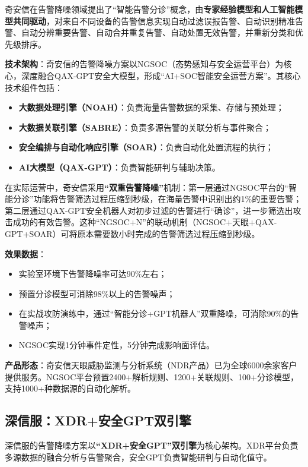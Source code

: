 \documentclass[11pt,a4paper]{article}
\begin{document}
奇安信在告警降噪领域提出了“智能告警分诊”概念，由\textbf{专家经验模型和人工智能模型共同驱动}，对来自不同设备的告警信息实现自动过滤误报告警、自动识别精准告警、自动分辨重要告警、自动合并重复告警、自动处置无效告警，并重新分类和优先级排序。

\textbf{技术架构}：奇安信的告警降噪方案以NGSOC（态势感知与安全运营平台）为核心，深度融合QAX-GPT安全大模型，形成“AI+SOC智能安全运营方案”。其核心技术组件包括：
\begin{itemize}
    \item \textbf{大数据处理引擎（NOAH）}：负责海量告警数据的采集、存储与预处理；
    \item \textbf{大数据关联引擎（SABRE）}：负责多源告警的关联分析与事件聚合；
    \item \textbf{安全编排与自动化响应引擎（SOAR）}：负责自动化处置流程的执行；
    \item \textbf{AI大模型（QAX-GPT）}：负责智能研判与辅助决策。
\end{itemize}

在实际运营中，奇安信采用\textbf{“双重告警降噪”}机制：第一层通过NGSOC平台的“智能分诊”功能将告警筛选过程压缩到秒级，在海量告警中识别出约1\%的重要告警；第二层通过QAX-GPT安全机器人对初步过滤的告警进行“确诊”，进一步筛选出攻击成功的有效告警。这种“NGSOC+N”的联动机制（NGSOC+天眼+QAX-GPT+SOAR）可将原本需要数小时完成的告警筛选过程压缩到秒级。

\textbf{效果数据}：
\begin{itemize}
    \item 实验室环境下告警降噪率可达90\%左右；
    \item 预置分诊模型可消除98\%以上的告警噪声；
    \item 在实战攻防演练中，通过“智能分诊+GPT机器人”双重降噪，可消除90\%的告警噪声；
    \item NGSOC实现1分钟事件定性，5分钟完成影响面评估。
\end{itemize}

\textbf{产品形态}：奇安信天眼威胁监测与分析系统（NDR产品）已为全球6000余家客户提供服务。NGSOC平台预置2400+解析规则、1200+关联规则、100+分诊模型，支持1000+种数据源的自动化解析。

\subsection{深信服：XDR+安全GPT双引擎}

深信服的告警降噪方案以\textbf{“XDR+安全GPT”双引擎}为核心架构。XDR平台负责多源数据的融合分析与告警聚合，安全GPT负责智能研判与自动化值守。
\end{document}

